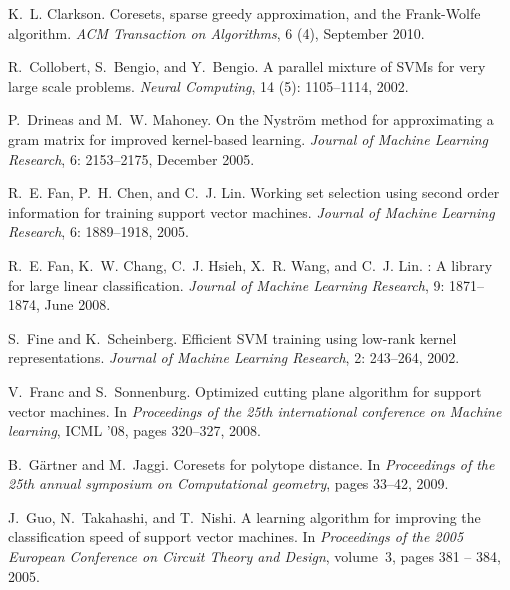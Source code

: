 \documentclass[twoside]{article}
\begin{document}
\begin{thebibliography}{45}
K.~L. Clarkson.
\newblock Coresets, sparse greedy approximation, and the {Frank-Wolfe}
  algorithm.
\newblock \emph{ACM Transaction on Algorithms}, 6 (4), September 2010.

R.~Collobert, S.~Bengio, and Y.~Bengio.
\newblock A parallel mixture of {SVM}s for very large scale problems.
\newblock \emph{Neural Computing}, 14 (5): 1105--1114, 2002.

P.~Drineas and M.~W. Mahoney.
\newblock On the {N}ystr\"{o}m method for approximating a gram matrix for
  improved kernel-based learning.
\newblock \emph{Journal of Machine Learning Research}, 6: 2153--2175,
  December 2005.

R.~E. Fan, P.~H. Chen, and C.~J. Lin.
\newblock Working set selection using second order information for training
  support vector machines.
\newblock \emph{Journal of Machine Learning Research}, 6: 1889--1918,
  2005.

R.~E. Fan, K.~W. Chang, C.~J. Hsieh, X.~R. Wang, and C.~J. Lin.
: {A} library for large linear classification.
\newblock \emph{Journal of Machine Learning Research}, 9: 1871--1874,
  June 2008.

S.~Fine and K.~Scheinberg.
\newblock Efficient {SVM} training using low-rank kernel representations.
\newblock \emph{Journal of Machine Learning Research}, 2: 243--264,
  2002.

V.~Franc and S.~Sonnenburg.
\newblock Optimized cutting plane algorithm for support vector machines.
\newblock In \emph{Proceedings of the 25th international conference on Machine
  learning}, ICML '08, pages 320--327, 2008.

B.~G\"{a}rtner and M.~Jaggi.
\newblock Coresets for polytope distance.
\newblock In \emph{Proceedings of the 25th annual symposium on Computational
  geometry}, pages 33--42, 2009.

J.~Guo, N.~Takahashi, and T.~Nishi.
\newblock A learning algorithm for improving the classification speed of
  support vector machines.
\newblock In \emph{Proceedings of the 2005 European Conference on Circuit
  Theory and Design}, volume~3, pages 381 -- 384, 2005.


\end{thebibliography}
\end{document}
